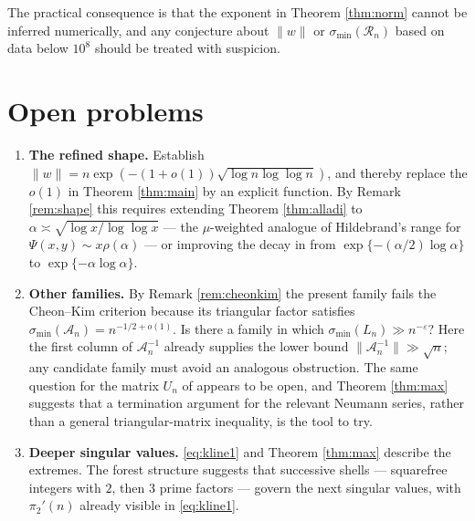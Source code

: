 \documentclass[11pt]{article}
\theoremstyle{definition}
\theoremstyle{remark}
\newcommand{\Rc}{\mathcal{R}}
\newcommand{\Ac}{\mathcal{A}}
\begin{document}
The practical consequence is that the exponent in Theorem \ref{thm:norm} cannot be
inferred numerically, and any conjecture about $\|w\|$ or $\sigma_{\min}(\Rc_n)$
based on data below $10^8$ should be treated with suspicion.

\section{Open problems}\label{sec:open}

\begin{enumerate}
\item \textbf{The refined shape.} Establish $\|w\| = n\exp(-(1+o(1))\sqrt{\log
n\log\log n})$, and thereby replace the $o(1)$ in Theorem \ref{thm:main} by an
explicit function. By Remark \ref{rem:shape} this requires extending Theorem
\ref{thm:alladi} to $\alpha\asymp\sqrt{\log x/\log\log x}$ --- the $\mu$-weighted
analogue of Hildebrand's range for $\Psi(x,y)\sim x\rho(\alpha)$ \cite{hildtenen}
--- or improving the decay in \cite[Thm.~2]{alladiJNT} from
$\exp\{-(\alpha/2)\log\alpha\}$ to $\exp\{-\alpha\log\alpha\}$.
\item \textbf{Other families.} By Remark \ref{rem:cheonkim} the present family
fails the Cheon--Kim criterion because its triangular factor satisfies
$\sigma_{\min}(\Ac_n)=n^{-1/2+o(1)}$. Is there a family in which
$\sigma_{\min}(L_n)\gg n^{-\varepsilon}$? Here the first column of
$\Ac_n^{-1}$ already supplies the lower bound $\|\Ac_n^{-1}\|\gg\sqrt n$; any
candidate family must avoid an analogous obstruction. The same question for
the matrix $U_n$ of \cite{bordellescloitre} appears to be open, and Theorem
\ref{thm:max} suggests that a termination argument for the relevant Neumann
series, rather than a general triangular-matrix inequality, is the tool to try.
\item \textbf{Deeper singular values.} \eqref{eq:kline1} and Theorem
\ref{thm:max} describe the extremes. The forest structure suggests that successive
shells --- squarefree integers with $2$, then $3$ prime factors --- govern the next
singular values, with $\pi_2'(n)$ already visible in \eqref{eq:kline1}.
\end{enumerate}
\end{document}
